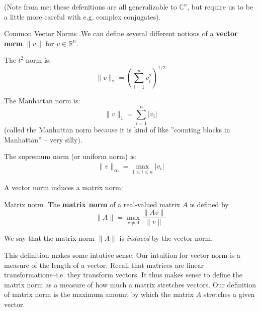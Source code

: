 \documentclass[12pt,letterpaper]{article}
\newcommand{\R}{\mathbb{R}}
\newcommand{\C}{\mathbb{C}}
\begin{document}
(Note from me: these defenitions are all generalizable to $\C^n$, but require us to be a little more careful with e.g. complex conjugates).

\begin{defn}{Common Vector Norms}
.We can define several different notions of a \textbf{vector norm} $\lVert v \rVert$ for $v \in \R^n$.

The $l^2$ norm is:
\begin{equation}
	\lVert v \rVert_2 = \left( \sum_{i=1}^n v_i^2 \right)^{1/2}
\end{equation}

The Manhattan norm is:
\begin{equation}
	\lVert v \rVert_1 = \sum_{i=1}^n \lvert v_i \rvert
\end{equation}
(called the Manhattan norm because it is kind of like ''counting blocks in Manhattan'' -- very silly).

\medskip

The supremum norm (or uniform norm) is:
\begin{eqnarray}
	\lVert v \rVert_\infty = \max_{1 \leq i \leq n} \lvert v_i \rvert
\end{eqnarray}
\label{def:vector_norm}
\end{defn}

A vector norm induces a matrix norm:
\begin{defn}{Matrix norm}
.The \textbf{matrix norm} of a real-valued matrix $A$ is defined by
\begin{equation}
	\lVert A \rVert = \max_{v \neq 0} \frac{\lVert A v \rVert}{\lVert v \rVert}
\end{equation}

We say that the matrix norm $\lVert A \rVert$ is \textit{induced} by the vector norm.
\label{defn:matrix_norm}
\end{defn}

This definition makes some intutive sense: Our intuition for vector norm is a measure of the length of a vector. Recall that matrices are linear transformations--i.e. they transform vectors. It thus makes sense to define the matrix norm as a measure of how much a matrix stretches vectors. Our definition of matrix norm is the maximum amount by which the matrix $A$ stretches a given vector.
\end{document}
